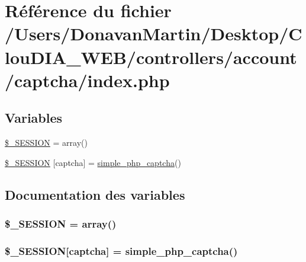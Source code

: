 \hypertarget{controllers_2account_2captcha_2index_8php}{}\section{Référence du fichier /\+Users/\+Donavan\+Martin/\+Desktop/\+Clou\+D\+I\+A\+\_\+\+W\+E\+B/controllers/account/captcha/index.php}
\label{controllers_2account_2captcha_2index_8php}
\subsection*{Variables}
\begin{DoxyCompactItemize}
\item 
\hyperlink{controllers_2account_2captcha_2index_8php_a5f545b9684799a00f7a14442205b98e3}{\$\+\_\+\+S\+E\+S\+S\+I\+O\+N} = array()
\item 
\hyperlink{controllers_2account_2captcha_2index_8php_a79e5cbd2296bd10a361f2fae6ab637c7}{\$\+\_\+\+S\+E\+S\+S\+I\+O\+N} \mbox{[}\textquotesingle{}captcha\textquotesingle{}\mbox{]} = \hyperlink{simple-php-captcha_8php_a232c6fd22213d7756e94f0db2a361743}{simple\+\_\+php\+\_\+captcha}()
\end{DoxyCompactItemize}


\subsection{Documentation des variables}
\hypertarget{controllers_2account_2captcha_2index_8php_a5f545b9684799a00f7a14442205b98e3}{}
\subsubsection[{\$\+\_\+\+S\+E\+S\+S\+I\+O\+N}]{\setlength{\rightskip}{0pt plus 5cm}\$\+\_\+\+S\+E\+S\+S\+I\+O\+N = array()}\label{controllers_2account_2captcha_2index_8php_a5f545b9684799a00f7a14442205b98e3}
\hypertarget{controllers_2account_2captcha_2index_8php_a79e5cbd2296bd10a361f2fae6ab637c7}{}
\subsubsection[{\$\+\_\+\+S\+E\+S\+S\+I\+O\+N}]{\setlength{\rightskip}{0pt plus 5cm}\$\+\_\+\+S\+E\+S\+S\+I\+O\+N\mbox{[}\textquotesingle{}captcha\textquotesingle{}\mbox{]} = {\bf simple\+\_\+php\+\_\+captcha}()}\label{controllers_2account_2captcha_2index_8php_a79e5cbd2296bd10a361f2fae6ab637c7}
